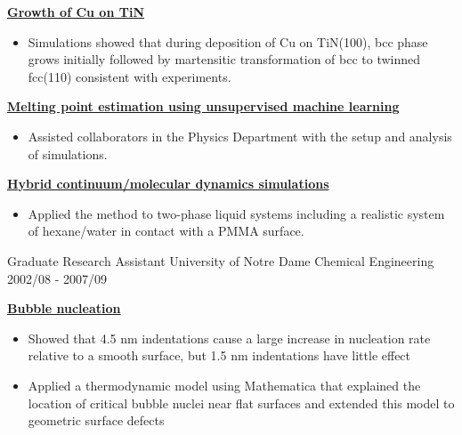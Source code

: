 \begin{cventries}
{\begin{cvitems}
\begin{itemize}
                \end{itemize}
            \item {\textbf{\underline{Growth of Cu on TiN}}}
                \vspace{2pt}
                \begin{itemize}
                \item {Simulations showed that during deposition of Cu on TiN(100), bcc phase grows initially followed by martensitic transformation of bcc to twinned fcc(110) consistent with experiments.}
                \end{itemize}
            \item {\textbf{\underline{Melting point estimation using unsupervised machine learning}}}
                \vspace{2pt}
                \begin{itemize}
                \item {Assisted collaborators in the Physics Department with the setup and analysis of simulations.}
                \end{itemize}
            \item {\textbf{\underline{Hybrid continuum/molecular dynamics simulations}}}
                \vspace{2pt}
                \begin{itemize}
                \item {Applied the method to two-phase liquid systems including a realistic system of hexane/water in contact with a PMMA surface.}
                \end{itemize}
        \end{cvitems}
    }

  \cventry
    {Graduate Research Assistant} %
    {University of Notre Dame} %
    {Chemical Engineering} %
    {2002/08 - 2007/09} %
    {
      \begin{cvitems} %
        \item {\textbf{\underline{Bubble nucleation}}}
            \begin{itemize}
                \item {Showed that 4.5 nm indentations cause a large increase in nucleation rate relative to a smooth surface, but 1.5 nm indentations have little effect}
                \item {Applied a thermodynamic model using Mathematica that explained the location of critical bubble nuclei near flat surfaces and extended this model to geometric surface defects}
            \end{itemize}
      \end{cvitems}
    }
    

\end{cventries}
